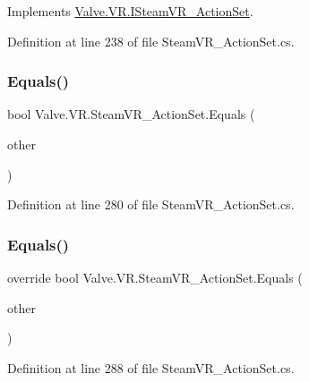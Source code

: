 Implements \mbox{\hyperlink{interface_valve_1_1_v_r_1_1_i_steam_v_r___action_set_a7f2befeb3e536b020c6a9a72ac16597b}{Valve.\+V\+R.\+I\+Steam\+V\+R\+\_\+\+Action\+Set}}.



Definition at line 238 of file Steam\+V\+R\+\_\+\+Action\+Set.\+cs.

\mbox{\label{class_valve_1_1_v_r_1_1_steam_v_r___action_set_a5758ecaf3e9b9bc26db3ba6f64cc9a39}} 
\subsubsection{\texorpdfstring{Equals()}{Equals()}\hspace{0.1cm}{\footnotesize\ttfamily [1/2]}}
{\footnotesize\ttfamily bool Valve.\+V\+R.\+Steam\+V\+R\+\_\+\+Action\+Set.\+Equals (\begin{DoxyParamCaption}\item[{\mbox{\hyperlink{class_valve_1_1_v_r_1_1_steam_v_r___action_set}{Steam\+V\+R\+\_\+\+Action\+Set}}}]{other }\end{DoxyParamCaption})}



Definition at line 280 of file Steam\+V\+R\+\_\+\+Action\+Set.\+cs.

\mbox{\label{class_valve_1_1_v_r_1_1_steam_v_r___action_set_a1093904e530e05fa8b4161285bbc7a3f}} 
\subsubsection{\texorpdfstring{Equals()}{Equals()}\hspace{0.1cm}{\footnotesize\ttfamily [2/2]}}
{\footnotesize\ttfamily override bool Valve.\+V\+R.\+Steam\+V\+R\+\_\+\+Action\+Set.\+Equals (\begin{DoxyParamCaption}\item[{object}]{other }\end{DoxyParamCaption})}



Definition at line 288 of file Steam\+V\+R\+\_\+\+Action\+Set.\+cs.


